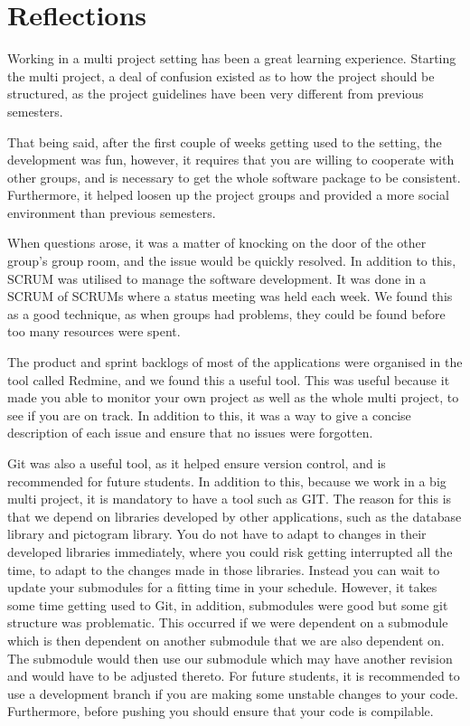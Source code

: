 \chapter{Reflections}
Working in a multi project setting has been a great learning experience.
Starting the multi project, a deal of confusion existed as to how the project should be structured, as the project guidelines have been very different from previous semesters.

That being said, after the first couple of weeks getting used to the setting, the development was fun, however, it requires that you are willing to cooperate with other groups, and is necessary to get the whole software package to be consistent.
Furthermore, it helped loosen up the project groups and provided a more social environment than previous semesters.

When questions arose, it was a matter of knocking on the door of the other group's group room, and the issue would be quickly resolved.
In addition to this, SCRUM was utilised to manage the software development.
It was done in a SCRUM of SCRUMs where a status meeting was held each week.
We found this as a good technique, as when groups had problems, they could be found before too many resources were spent.

The product and sprint backlogs of most of the applications were organised in the tool called Redmine, and we found this a useful tool.
This was useful because it made you able to monitor your own project as well as the whole multi project, to see if you are on track.
In addition to this, it was a way to give a concise description of each issue and ensure that no issues were forgotten.

Git was also a useful tool, as it helped ensure version control, and is recommended for future students.
In addition to this, because we work in a big multi project, it is mandatory to have a tool such as GIT.
The reason for this is that we depend on libraries developed by other applications, such as the database library and pictogram library.
You do not have to adapt to changes in their developed libraries immediately, where you could risk getting interrupted all the time, to adapt to the changes made in those libraries. 
Instead you can wait to update your submodules for a fitting time in your schedule.
However, it takes some time getting used to Git, in addition, submodules were good but some git structure was problematic.
This occurred if we were dependent on a submodule which is then dependent on another submodule that we are also dependent on.
The submodule would then use our submodule which may have another revision and would have to be adjusted thereto.
For future students, it is recommended to use a development branch if you are making some unstable changes to your code.
Furthermore, before pushing you should ensure that your code is compilable.


